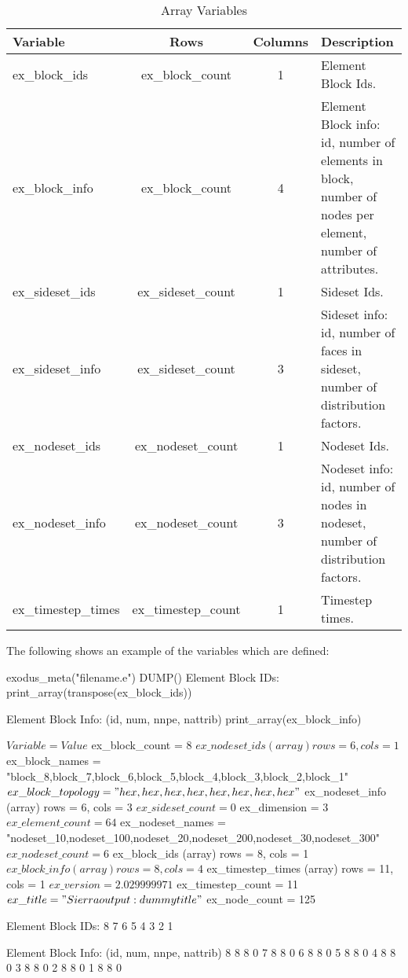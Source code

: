 \begin{longtable}{lccp{4.0in}}
\caption{\exo{} Array Variables}\\
Variable              & Rows  & Columns & Description \\
\hline
\endhead
ex\_block\_ids	      & ex\_block\_count & 1 & Element Block Ids. \\
ex\_block\_info	      & ex\_block\_count & 4 & Element Block info:
id, number of elements in block, number of nodes per element, number
of attributes. \\
ex\_sideset\_ids      & ex\_sideset\_count & 1 & Sideset Ids. \\
ex\_sideset\_info     & ex\_sideset\_count & 3 & Sideset info: id,
number of faces in sideset, number of distribution factors. \\
ex\_nodeset\_ids      & ex\_nodeset\_count & 1 & Nodeset Ids. \\
ex\_nodeset\_info     & ex\_nodeset\_count & 3 & Nodeset info: id,
number of nodes in nodeset, number of distribution factors. \\
ex\_timestep\_times   & ex\_timestep\_count & 1 & Timestep times. \\
\hline
\end{longtable}

The following shows an example of the variables which are defined:

\begin{apinp}
  {exodus\_meta("filename.e")}
  {DUMP()}
  Element Block IDs:
  {print\_array(transpose(ex\_block\_ids))}

  Element Block Info: (id, num, nnpe, nattrib)
  {print\_array(ex\_block\_info)}
\end{apinp}

\begin{apout}
$   Variable    = Value
$  {ex\_block\_count	= 8}
$  {ex\_nodeset\_ids	 (array) rows = 6, cols = 1}
$  {ex\_block\_names	= "block\_8,block\_7,block\_6,block\_5,block\_4,block\_3,block\_2,block\_1"}
$  {ex\_block\_topology	= "hex,hex,hex,hex,hex,hex,hex,hex"}
$  {ex\_nodeset\_info	 (array) rows = 6, cols = 3}
$  {ex\_sideset\_count	= 0}
$  {ex\_dimension	= 3}
$  {ex\_element\_count	= 64}
$  {ex\_nodeset\_names	= "nodeset\_10,nodeset\_100,nodeset\_20,nodeset\_200,nodeset\_30,nodeset\_300"}
$  {ex\_nodeset\_count	= 6}
$  {ex\_block\_ids	 (array) rows = 8, cols = 1}
$  {ex\_block\_info	 (array) rows = 8, cols = 4}
$  {ex\_timestep\_times	 (array) rows = 11, cols = 1}
$  {ex\_version	= 2.029999971}
$  {ex\_timestep\_count	= 11}
$  {ex\_title  	= "Sierra output: dummy title"}
$  {ex\_node\_count	= 125}

Element Block IDs:
	8	7	6	5	4	3	2	1

Element Block Info: (id, num, nnpe, nattrib)
	8	8	8	0
	7	8	8	0
	6	8	8	0
	5	8	8	0
	4	8	8	0
	3	8	8	0
	2	8	8	0
	1	8	8	0
\end{apout}

